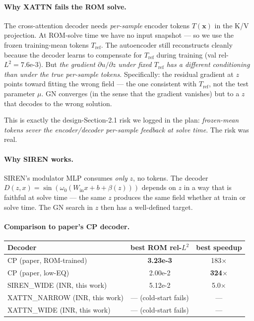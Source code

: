 \documentclass[11pt]{article}
\begin{document}
\paragraph{Why XATTN fails the ROM solve.}
The cross-attention decoder needs \emph{per-sample} encoder tokens
$T(\mathbf{x})$ in the K/V projection. At ROM-solve time we have no
input snapshot --- so we use the frozen training-mean tokens
$T_{\text{ref}}$. The autoencoder still reconstructs cleanly because
the decoder learns to compensate for $T_{\text{ref}}$ during training
(val rel-$L^2 = 7.6$e-3). But \emph{the gradient $\partial u / \partial z$
under fixed $T_{\text{ref}}$ has a different conditioning than under
the true per-sample tokens.} Specifically: the residual gradient at $z$
points toward fitting the wrong field --- the one consistent with
$T_{\text{ref}}$, not the test parameter $\mu$. GN converges (in the
sense that the gradient vanishes) but to a $z$ that decodes to the
wrong solution.

This is exactly the design-Section-2.1 risk we logged in the plan:
\emph{frozen-mean tokens sever the encoder/decoder per-sample feedback
at solve time}. The risk was real.

\paragraph{Why SIREN works.}
SIREN's modulator MLP consumes \emph{only} $z$, no tokens. The decoder
$D(z, x) = \sin(\omega_0 (W_{\text{in}} x + b + \beta(z)))$ depends on
$z$ in a way that is faithful at solve time --- the same $z$ produces
the same field whether at train or solve time. The GN search in $z$
then has a well-defined target.

\paragraph{Comparison to paper's CP decoder.}
\begin{center}
\begin{tabular}{lcc}
\toprule
Decoder & best ROM rel-$L^2$ & best speedup \\
\midrule
CP (paper, ROM-trained)         & \textbf{3.23e-3}   & 183$\times$ \\
CP (paper, low-EQ)              & 2.00e-2            & \textbf{324$\times$} \\
\midrule
SIREN\_WIDE (INR, this work)    & 5.12e-2            & 5.0$\times$ \\
XATTN\_NARROW (INR, this work)  & --- (cold-start fails) & --- \\
XATTN\_WIDE (INR, this work)    & --- (cold-start fails) & --- \\
\bottomrule
\end{tabular}
\end{center}
\end{document}
